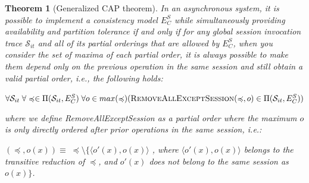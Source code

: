 \documentclass[conference]{IEEEtran}
\newtheorem{theorem}{Theorem}[section]
\begin{document}
	\begin{theorem}[Generalized CAP theorem]\label{thrm:capan}
		In an asynchronous system, it is possible to implement a consistency model $E^S_C$ while simultaneously providing availability and partition tolerance if and only if for any global session invocation trace $\mathcal{S}_{it}$ and all of its partial orderings that are allowed by $E^S_C$, when you consider the set of maxima of each partial order, it is always possible to make them depend only on the previous operation in the same session and still obtain a valid partial order, i.e., the following holds:
		
		
		$\forall \mathcal{S}_{it} \; \forall \preccurlyeq \in \Pi(\mathcal{S}_{it},E^S_C) \; \forall o \in max(\preccurlyeq) \\ (\textsc{RemoveAllExceptSession}(\preccurlyeq,o) \in \Pi(\mathcal{S}_{it},E^S_C) ) $
		
		where we define {\sc RemoveAllExceptSession} as a partial order where the maximum $o$ is only directly ordered after prior operations in the same session, i.e.:
		
		$(\preccurlyeq,o(x)) \equiv \; \preccurlyeq \setminus \{ \langle o'(x),o(x) \rangle$ , where $\langle o'(x),o(x) \rangle$ belongs to the transitive reduction of $\preccurlyeq$, and $o'(x)$ does not belong to the same session as $o(x)\}$.
		
		
		
	\end{theorem}
	
\end{document}
